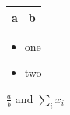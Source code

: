 \begin{tabular}{cc}\hline a & b \\\hline\end{tabular}

\begin{itemize}\item one\item two\end{itemize}

$\frac{a}{b}$ and $\sum_i x_i$
